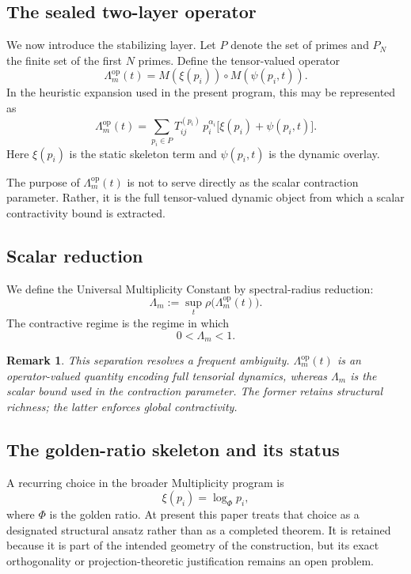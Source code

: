 \documentclass[11pt,a4paper]{article}
\newtheorem{remark}[theorem]{Remark}
\newcommand{\op}{\mathrm{op}}
\newcommand{\spr}{\rho}
\begin{document}
\subsection{The sealed two-layer operator}

We now introduce the stabilizing layer. Let \(P\) denote the set of primes and \(P_N\) the finite set of the first \(N\) primes. Define the tensor-valued operator
\[
\Lambda_m^{\op}(t)
=
M(\xi(p_i)) \circ M(\psi(p_i,t)).
\]
In the heuristic expansion used in the present program, this may be represented as
\[
\Lambda_m^{\op}(t)
=
\sum_{p_i\in P}
T_{ij}^{(p_i)}\, p_i^{\alpha_i}\bigl[\xi(p_i)+\psi(p_i,t)\bigr].
\]
Here \(\xi(p_i)\) is the static skeleton term and \(\psi(p_i,t)\) is the dynamic overlay.

The purpose of \(\Lambda_m^{\op}(t)\) is not to serve directly as the scalar contraction parameter. Rather, it is the full tensor-valued dynamic object from which a scalar contractivity bound is extracted.

\subsection{Scalar reduction}

We define the Universal Multiplicity Constant by spectral-radius reduction:
\[
\Lambda_m := \sup_t \spr\!\bigl(\Lambda_m^{\op}(t)\bigr).
\]
The contractive regime is the regime in which
\[
0 < \Lambda_m < 1.
\]

\begin{remark}
This separation resolves a frequent ambiguity. \(\Lambda_m^{\op}(t)\) is an operator-valued quantity encoding full tensorial dynamics, whereas \(\Lambda_m\) is the scalar bound used in the contraction parameter. The former retains structural richness; the latter enforces global contractivity.
\end{remark}

\subsection{The golden-ratio skeleton and its status}

A recurring choice in the broader Multiplicity program is
\[
\xi(p_i)=\log_{\Phi} p_i,
\]
where \(\Phi\) is the golden ratio. At present this paper treats that choice as a designated structural ansatz rather than as a completed theorem. It is retained because it is part of the intended geometry of the construction, but its exact orthogonality or projection-theoretic justification remains an open problem.
\end{document}
